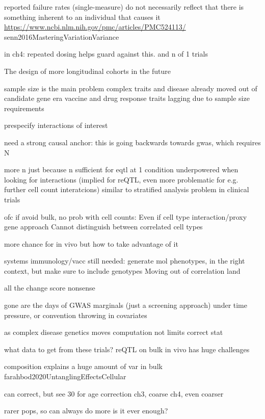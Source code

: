 \begin{outline}
        reported failure rates (single-measure) do not necessarily reflect that there is something inherent to an individual that causes it \url{https://www.ncbi.nlm.nih.gov/pmc/articles/PMC524113/} senn2016MasteringVariationVariance

            in ch4: repeated dosing helps guard against this.
            and n of 1 trials

The design of more longitudinal cohorts in the future

    sample size is the main problem
        complex traits and disease already moved out of candidate gene era
        vaccine and drug response traits lagging due to sample size requirements

        prespecify interactions of interest

    need a strong causal anchor: this is going backwards towards gwas, which requires N

    more n
        just because n sufficient for eqtl at 1 condition
        underpowered when looking for interactions (implied for reQTL, even more problematic for e.g. further cell count interatcions)
        similar to stratified analysis problem in clinical trials

    ofc if avoid bulk, no prob with cell counts:
        Even if cell type interaction/proxy gene approach
        Cannot distinguish between correlated cell types

    more chance for in vivo
        but how to take advantage of it

    systems immunology/vacc still needed: generate mol phenotypes, in the right context,
    but make sure to include genotypes
    Moving out of correlation land

    all the change score nonsense

    gone are the days of GWAS marginals (just a screening approach)
        under time pressure, or convention
        throwing in covariates

    as     complex disease genetics moves 
    computation not limits correct stat

what data to get from these trials?
    reQTL on bulk in vivo has huge challenges

    composition explains a huge amount of var in bulk farahbod2020UntanglingEffectsCellular

    can correct, but see 30 for age correction
        ch3, coarse
        ch4, even coarser

        rarer pops, so can always do more
        is it ever enough?


\end{outline}
